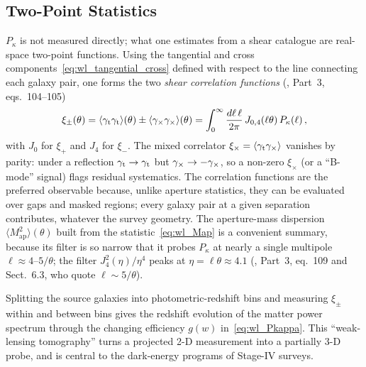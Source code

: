\subsection{Two-Point Statistics}

$P_\kappa$ is not measured directly; what one estimates from a shear
catalogue are real-space two-point functions.  Using the tangential and
cross components~\eqref{eq:wl_tangential_cross} defined with respect to the
line connecting each galaxy pair, one forms the two \emph{shear
correlation functions}
(\citealp{schneider_kochanek_wambsganss_2006}, Part~3, eqs.~104--105)
\begin{equation}
    \xi_\pm(\theta)
    = \langle\gamma_{\mathrm t}\gamma_{\mathrm t}\rangle(\theta)
    \pm \langle\gamma_\times\gamma_\times\rangle(\theta)
    = \int_0^\infty \frac{d\ell\,\ell}{2\pi}\,
    J_{0,4}(\ell\theta)\, P_\kappa(\ell)\,,
    \label{eq:wl_xipm}
\end{equation}
with $J_0$ for $\xi_+$ and $J_4$ for $\xi_-$.  The mixed correlator
$\xi_\times = \langle\gamma_{\mathrm t}\gamma_\times\rangle$ vanishes by
parity: under a reflection $\gamma_{\mathrm t}\to\gamma_{\mathrm t}$ but
$\gamma_\times \to -\gamma_\times$, so a non-zero $\xi_\times$ (or a
``B-mode'' signal) flags residual systematics.  The correlation functions
are the preferred observable because, unlike aperture statistics, they can
be evaluated over gaps and masked regions; every galaxy pair at a given
separation contributes, whatever the survey geometry.  The aperture-mass
dispersion $\langle M_{\mathrm{ap}}^2\rangle(\theta)$ built from the
statistic~\eqref{eq:wl_Map} is a convenient summary, because its
filter is so narrow that it probes $P_\kappa$ at nearly a single
multipole $\ell \approx 4$--$5/\theta$; the filter $J_4^2(\eta)/\eta^4$
peaks at $\eta = \ell\theta \approx 4.1$
(\citealp{schneider_kochanek_wambsganss_2006}, Part~3, eq.~109 and
Sect.~6.3, who quote $\ell \sim 5/\theta$).

\begin{remark}[Tomography]
Splitting the source galaxies into photometric-redshift
bins and measuring $\xi_\pm$ within and between bins gives the redshift
evolution of the matter power spectrum through the changing efficiency
$g(w)$ in~\eqref{eq:wl_Pkappa}.  This ``weak-lensing tomography'' turns a
projected 2-D measurement into a partially 3-D probe, and is central to
the dark-energy programs of Stage-IV surveys.
\end{remark}


